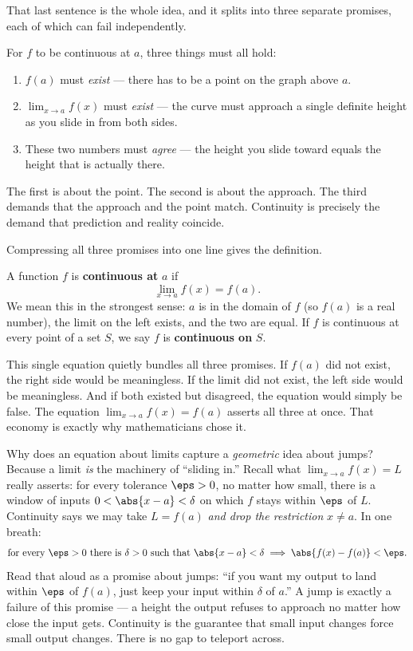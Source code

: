 That last sentence is the whole idea, and it splits into three separate promises, each of
which can fail independently.

\begin{intuitionbox}
For $f$ to be continuous at $a$, three things must all hold:
\begin{enumerate}
  \item $f(a)$ must \emph{exist} --- there has to be a point on the graph above $a$.
  \item $\displaystyle\lim_{x\to a} f(x)$ must \emph{exist} --- the curve must approach a
        single definite height as you slide in from both sides.
  \item These two numbers must \emph{agree} --- the height you slide toward equals the
        height that is actually there.
\end{enumerate}
The first is about the point. The second is about the approach. The third demands that
the approach and the point match. Continuity is precisely the demand that prediction and
reality coincide.
\end{intuitionbox}

Compressing all three promises into one line gives the definition.

\begin{definition}
\label{ch08:def-continuity}
A function $f$ is \textbf{continuous at} $a$ if
\[
  \lim_{x\to a} f(x) = f(a).
\]
We mean this in the strongest sense: $a$ is in the domain of $f$ (so $f(a)$ is a real
number), the limit on the left exists, and the two are equal. If $f$ is continuous at
every point of a set $S$, we say $f$ is \textbf{continuous on} $S$.
\end{definition}

This single equation quietly bundles all three promises. If $f(a)$ did not exist, the
right side would be meaningless. If the limit did not exist, the left side would be
meaningless. And if both existed but disagreed, the equation would simply be false. The
equation $\lim_{x\to a} f(x) = f(a)$ asserts all three at once. That economy is exactly
why mathematicians chose it.

\begin{happeningbox}
Why does an equation about limits capture a \emph{geometric} idea about jumps? Because a
limit \emph{is} the machinery of ``sliding in.'' Recall what $\lim_{x\to a} f(x)=L$ really
asserts: for every tolerance $\eps>0$, no matter how small, there is a window of inputs
$0<\abs{x-a}<\delta$ on which $f$ stays within $\eps$ of $L$. Continuity says we may take
$L=f(a)$ \emph{and drop the restriction} $x\ne a$. In one breath:
\[
  \text{for every } \eps>0 \text{ there is } \delta>0 \text{ such that }
  \abs{x-a}<\delta \implies \abs{f(x)-f(a)}<\eps.
\]
Read that aloud as a promise about jumps: ``if you want my output to land within $\eps$
of $f(a)$, just keep your input within $\delta$ of $a$.'' A jump is exactly a failure of
this promise --- a height the output refuses to approach no matter how close the input
gets. Continuity is the guarantee that small input changes force small output changes.
There is no gap to teleport across.
\end{happeningbox}

